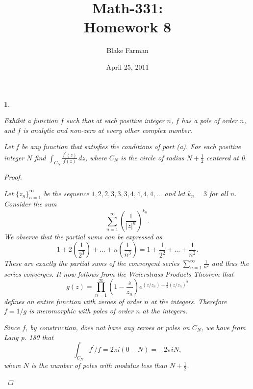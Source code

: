 \documentclass[10pt]{amsart}
\author{Blake Farman}
\title{Math-331:\\Homework 8}
\date{April 25, 2011}\pdfpagewidth 8.5in
\begin{document}
\maketitle

\newtheorem{thm}{}
\newtheorem{lem}{Lemma}[thm]
\newcommand{\D}{\mathbb{D}}
\newcommand{\HH}{\mathcal{H}}

\begin{thm}
  \label{Ex1}
  \begin{alphaenum}
    \item
      Exhibit a function $f$ such that at each positive integer $n$, $f$ has a pole of order $n$, and $f$ is analytic and non-zero at every other complex number.
    \item
      Let $f$ be any function that satisfies the conditions of part (a).
      For each positive integer $N$ find $\displaystyle{\int_{C_N} \frac{f^{\prime}(z)}{f(z)}\,dz}$, where $C_N$ is the circle of radius $N + \frac{1}{2}$ centered at 0.
    \end{alphaenum}
  \begin{proof}
    \begin{alphaenum}
    \item
      Let $\{z_n\}_{n=1}^{\infty}$ be the sequence $1,2,2,3,3,3,4,4,4,4,\ldots$ and let $k_n = 3$ for all $n$.
      Consider the sum $$\sum_{n=1}^{\infty}\left(\frac{1}{|z|^n}\right)^{k_n}.$$
      We observe that the partial sums can be expressed as 
      $$1 + 2(\frac{1}{2^3}) + \ldots + n(\frac{1}{n^3}) = 1 + \frac{1}{2^2} + \ldots + \frac{1}{n^2}.$$
      These are exactly the partial sums of the convergent series $\sum_{n=1}^{\infty} \frac{1}{n^2}$ and thus the series converges.
      It now follows from the Weierstrass Products Theorem that 
      $$g(z) = \prod_{n=1}^{\infty}\left(1 - \frac{z}{z_n}\right)e^{(z/z_n) + \frac{1}{2}(z/z_n)^2}$$
      defines an entire function with zeroes of order $n$ at the integers.
      Therefore $f = 1/g$ is meromorphic with poles of order $n$ at the integers. 
    \item
      Since $f$, by construction, does not have any zeroes or poles on $C_N$, we have from Lang p. 180 that
      $$\int_{C_N} f^{\prime}/f = 2\pi i(0 - N) = -2\pi iN,$$
      where $N$ is the number of poles with modulus less than $N+\frac{1}{2}$.
    \end{alphaenum}
  \end{proof}
\end{thm}
\end{document}
